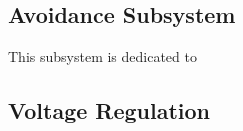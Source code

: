\subsection{Avoidance Subsystem}

\noindent This subsystem is dedicated to 

\subsection{Voltage Regulation}
